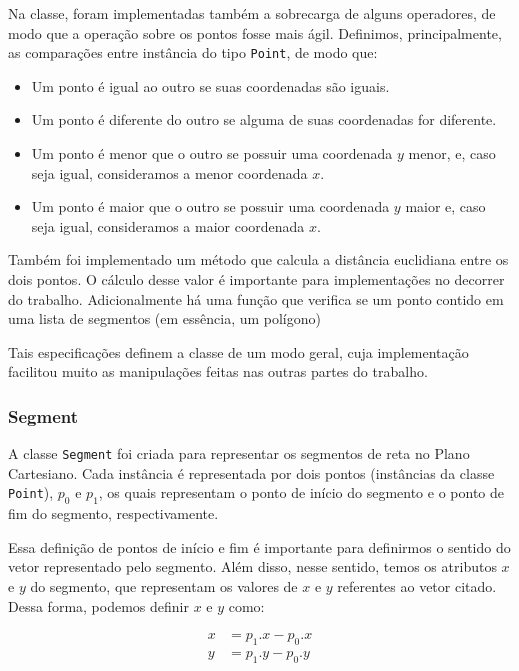 \documentclass{article}
\begin{document}
Na classe, foram implementadas também a sobrecarga de alguns operadores, de modo que a operação sobre os pontos fosse mais ágil. Definimos, principalmente, as comparações entre instância do tipo \texttt{Point}, de modo que:

\begin{itemize}
	\item Um ponto é igual ao outro se suas coordenadas são iguais.
	\item Um ponto é diferente do outro se alguma de suas coordenadas for diferente.
	\item Um ponto é menor que o outro se possuir uma coordenada \( y \) menor, e, caso seja igual, consideramos a menor coordenada \( x \).
	\item Um ponto é maior que o outro se possuir uma coordenada \( y \) maior e, caso seja igual, consideramos a maior coordenada \( x \).
\end{itemize}

Também foi implementado um método que calcula a distância euclidiana entre os dois pontos. O cálculo desse valor é importante para implementações no decorrer do trabalho. Adicionalmente há uma função que verifica se um ponto contido em uma lista de segmentos (em essência, um polígono)

Tais especificações definem a classe de um modo geral, cuja implementação facilitou muito as manipulações feitas nas outras partes do trabalho.

\subsubsection{Segment}

A classe \texttt{Segment} foi criada para representar os segmentos de reta no Plano Cartesiano. Cada instância é representada por dois pontos (instâncias da classe \texttt{Point}), \( p_0 \) e \( p_1 \), os quais representam o ponto de início do segmento e o ponto de fim do segmento, respectivamente.

Essa definição de pontos de início e fim é importante para definirmos o sentido do vetor representado pelo segmento. Além disso, nesse sentido, temos os atributos \( x \) e \( y \) do segmento, que representam os valores de \( x \) e \( y \) referentes ao vetor citado. Dessa forma, podemos definir \( x \) e \( y \) como:

\begin{align*}
	x & = p_1.x - p_0.x \\
	y & = p_1.y - p_0.y
\end{align*}
\end{document}
